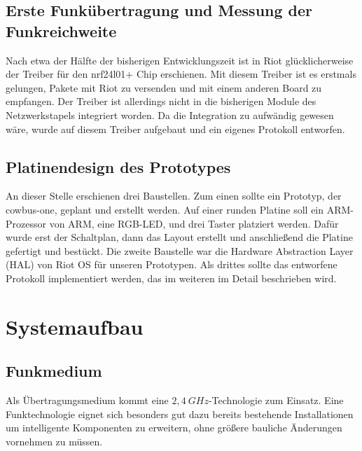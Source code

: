 \documentclass{IEEEtran}
\begin{document}
    \subsection{Erste Funkübertragung und Messung der Funkreichweite}
        Nach etwa der Hälfte der bisherigen Entwicklungszeit ist in Riot 
        glücklicherweise der Treiber für den nrf24l01+ Chip erschienen. Mit 
        diesem Treiber ist es erstmals gelungen, Pakete mit Riot zu versenden 
        und mit einem anderen Board zu empfangen.
        Der Treiber ist allerdings nicht in die bisherigen Module des 
        Netzwerkstapels integriert worden. Da die Integration zu aufwändig 
        gewesen wäre, wurde auf diesem Treiber aufgebaut und ein eigenes 
        Protokoll entworfen.

    \subsection{Platinendesign des Prototypes}
    An dieser Stelle erschienen drei Baustellen. Zum einen sollte ein Prototyp, 
    der cowbus-one, geplant und erstellt werden. Auf einer runden Platine soll 
    ein ARM-Prozessor von ARM, eine RGB-LED, und drei Taster platziert werden. 
    Dafür wurde erst der Schaltplan, dann das Layout erstellt und anschließend 
    die Platine gefertigt und bestückt.
    Die zweite Baustelle war die Hardware Abstraction Layer (HAL) von Riot OS 
    für unseren Prototypen. Als drittes sollte das entworfene Protokoll 
    implementiert werden, das im weiteren im Detail beschrieben wird.


\section{Systemaufbau}

    \subsection{Funkmedium}
        Als Übertragungsmedium kommt eine $2,4~GHz$-Technologie
        zum Einsatz. Eine Funktechnologie eignet sich besonders gut dazu
        bereits bestehende Installationen um intelligente Komponenten
        zu erweitern, ohne größere bauliche Änderungen vornehmen zu müssen.
\end{document}
